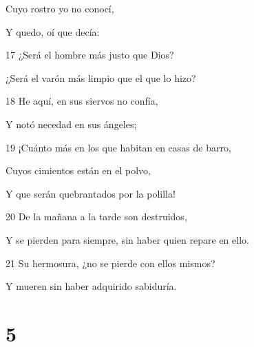 \par Cuyo rostro yo no conocí,
\par Y quedo, oí que decía:
\par 17 ¿Será el hombre más justo que Dios?
\par ¿Será el varón más limpio que el que lo hizo?
\par 18 He aquí, en sus siervos no confía,
\par Y notó necedad en sus ángeles;
\par 19 ¡Cuánto más en los que habitan en casas de barro,
\par Cuyos cimientos están en el polvo,
\par Y que serán quebrantados por la polilla!
\par 20 De la mañana a la tarde son destruidos,
\par Y se pierden para siempre, sin haber quien repare en ello. 
\par 21 Su hermosura, ¿no se pierde con ellos mismos?
\par Y mueren sin haber adquirido sabiduría.

\chapter{5}


